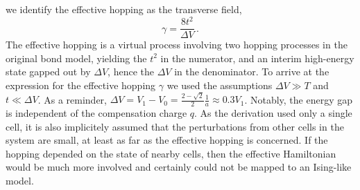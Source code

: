 %
we identify the effective hopping as the transverse field,
%
\begin{equation}
  \label{eq:gamma}
  \gamma = \frac{8 t^2}{\Delta V} \, .
\end{equation}
%
The effective hopping is a virtual process involving two hopping processes in
the original bond model, yielding the $t^2$ in the numerator, and an interim
high-energy state gapped out by $\Delta V$, hence the $\Delta V$ in the
denominator. To arrive at the expression for the effective hopping $\gamma$ we
used the assumptions $\Delta V \gg T$ and $t \ll \Delta V$. As a reminder,
$\Delta V = V_1 - V_0 = \frac{2 - \sqrt{2}}{2} \frac{1}{a} \approx 0.3 V_1$.
Notably, the energy gap is independent of the compensation charge $q$. As the
derivation used only a single cell, it is also implicitely assumed that the
perturbations from other cells in the system are small, at least as far as the
effective hopping is concerned. If the hopping depended on the state of nearby
cells, then the effective Hamiltonian would be much more involved and certainly
could not be mapped to an Ising-like model.


